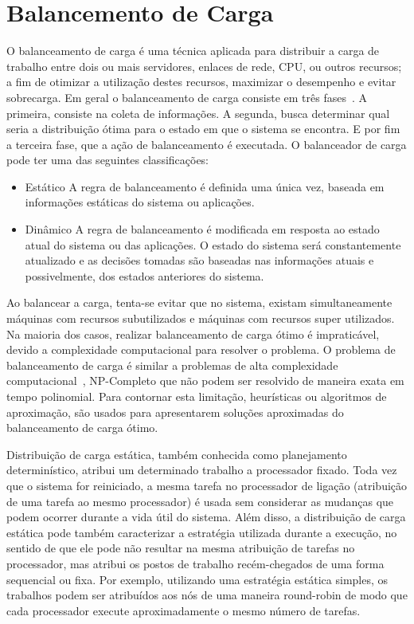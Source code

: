 \section{Balancemento de Carga}\label{intro:carga}

O balanceamento de carga é uma técnica aplicada para distribuir a carga de trabalho entre dois ou mais servidores, enlaces de rede, CPU, ou outros recursos; a fim de otimizar a utilização destes recursos, maximizar o desempenho e evitar sobrecarga. Em geral o balanceamento de carga consiste em três fases~\citep{carga}. A primeira, consiste na coleta de informações. A segunda, busca determinar qual seria a distribuição ótima para o estado em que o sistema se encontra. E por fim a terceira fase, que a ação de balanceamento é executada. O balanceador de carga pode ter uma das seguintes classificações:

\begin{itemize}
\item Estático A regra de balanceamento é definida uma única vez, baseada em informações estáticas do sistema ou aplicações.

\item Dinâmico A regra de balanceamento é modificada em resposta ao estado atual do sistema ou das aplicações. O estado do sistema será constantemente atualizado e as decisões tomadas são baseadas nas informações atuais e possivelmente, dos estados anteriores do sistema.
\end{itemize}

Ao balancear a carga, tenta-se evitar que no sistema, existam simultaneamente máquinas com recursos subutilizados e máquinas com recursos super utilizados. Na maioria dos casos, realizar balanceamento de carga ótimo é impraticável, devido a complexidade computacional para resolver o problema. O problema de balanceamento de carga  é similar a problemas de alta complexidade computacional~\citep{virtual}, NP-Completo que não podem ser resolvido de maneira exata em tempo polinomial. Para contornar esta limitação, heurísticas ou algoritmos de aproximação, são usados para apresentarem soluções aproximadas do balanceamento de carga ótimo.


Distribuição de carga estática, também conhecida como planejamento determinístico, atribui um determinado trabalho a processador fixado. Toda vez que o sistema for reiniciado, a mesma tarefa no processador de ligação (atribuição de uma tarefa ao mesmo processador) é usada sem considerar as mudanças que podem ocorrer durante a vida útil do sistema. Além disso, a distribuição de carga estática pode também caracterizar a estratégia utilizada durante a execução, no sentido de que ele pode não resultar na mesma atribuição de tarefas no processador, mas atribui os postos de trabalho recém-chegados de uma forma sequencial ou fixa. Por exemplo, utilizando uma estratégia estática simples, os trabalhos podem ser atribuídos aos nós de uma maneira round-robin de modo que cada processador execute aproximadamente o mesmo número de tarefas. 

